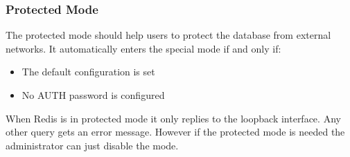 \subsubsection{Protected Mode}
The protected mode should help users to protect the database from external networks. It automatically enters the special mode if and only if:
\begin{itemize} 
\item The default configuration is set
\item No AUTH password is configured
\end{itemize}
When Redis is in protected mode it only replies to the loopback interface. Any other query gets an error message. However if the protected mode is needed the administrator can just disable the mode.\cite{RedisSecurity}

